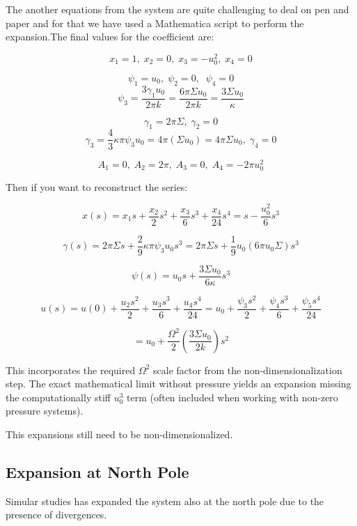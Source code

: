 \documentclass[12pt]{article}
\begin{document}
The another equations from the system are quite challenging to deal on pen and paper and for that we have used a Mathematica script to perform the expansion.The final values for the coefficient are:

$$
x_1 = 1 ,\; x_2 = 0 ,\; x_3 = - u_0^2 ,\; x_4 = 0
$$


$$
\psi_1 = u_0  ,\; \psi_2 = 0 ,\; \; \psi_4 = 0
$$
$$
\psi_3 = \frac{3\gamma_1 u_0}{2 \pi k} = \frac{6 \pi \Sigma u_0}{2 \pi k} = \frac{3 \Sigma u_0}{\kappa}
$$


$$
\gamma_1 = 2 \pi \Sigma ,\; \gamma_2 = 0 
$$
$$
\gamma_3 = \frac{4}{3} \kappa \pi \psi_3 u_0 = 4 \pi (\Sigma u_0) = 4 \pi \Sigma u_0 ,\; \gamma_4 = 0
$$


$$
A_1 = 0 ,\; A_2 =  2 \pi ,\; A_3 = 0 ,\; A_4 = - 2 \pi u_0^2
$$



Then if you want to reconstruct the series:


$$
x(s)=x_1 s+\frac{x_2}{2}s^2+\frac{x_3}{6}s^3+\frac{x_4}{24} s^4 =s-\frac{u_0^2}{6}s^3 
$$





$$
\gamma(s) = 2 \pi \Sigma s + \frac{2}{9} \kappa \pi \psi_3 u_0 s^3 = 2 \pi \Sigma s + \frac{1}{9}  u_0 (6 \pi u_0 \Sigma)s^3
$$

$$
\psi(s)=u_0s + \frac{3  \Sigma u_0}{6 \kappa }s^3
$$

$$
u(s)=u(0) + \frac{u_2 s^2}{2} + \frac{u_3 s^3}{6} + \frac{u_4 s^4}{24} = u_0 + \frac{\psi_3 s^2}{2} + \frac{\psi_4 s^3}{6} + \frac{\psi_5 s^4}{24}
$$

$$
= u_0 + \frac{\Omega^2}{2} \left(\frac{3 \Sigma u_0}{2 k}\right) s^2
$$

This incorporates the required $\Omega^2$ scale factor from the non-dimensionalization step. The exact mathematical limit without pressure yields an expansion missing the computationally stiff $u_0^3$ term (often included when working with non-zero pressure systems).

This expansions still need to be non-dimensionalized.

\subsection{Expansion at North Pole}
Simular studies \cite{freyMembraneAreaGain2022} \cite{christActiveShapeOscillations2021} has expanded the system also at the north pole due to the presence of divergences.
\end{document}
